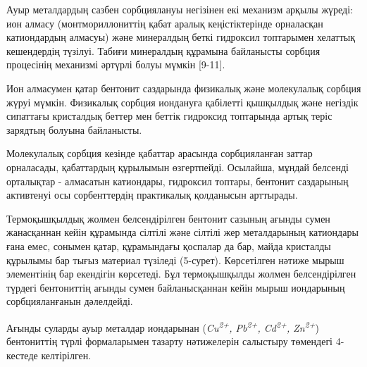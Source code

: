 \begin{multicols}{2}
Ауыр металдардың сазбен сорбциялануы негізінен екі механизм арқылы
жүреді: ион алмасу (монтмориллониттің қабат аралық кеңістіктерінде
орналасқан катиондардың алмасуы) және минералдың беткі гидроксил
топтарымен хелаттық кешендердің түзілуі. Табиғи минералдың құрамына
байланысты сорбция процесінің механизмі әртүрлі болуы мүмкін {[}9-11{]}.

Ион алмасумен қатар бентонит саздарында физикалық және молекулалық
сорбция жүруі мүмкін. Физикалық сорбция иондануға қабілетті қышқылдық
және негіздік сипаттағы кристалдық беттер мен беттік гидроксид
топтарында артық теріс зарядтың болуына байланысты.

Молекулалық сорбция кезінде қабаттар арасында сорбцияланған заттар
орналасады, қабаттардың құрылымын өзгертпейді. Осылайша, мұндай белсенді
орталықтар - алмасатын катиондары, гидроксил топтары, бентонит
саздарының активтенуі осы сорбенттердің практикалық қолданысын
арттырады.

Термоқышқылдық жолмен белсендірілген бентонит сазының ағынды сумен
жанасқаннан кейін құрамында сілтілі және сілтілі жер металдарының
катиондары ғана емес, сонымен қатар, құрамындағы қоспалар да бар, майда
кристалды құрылымы бар тығыз материал түзіледі (5-сурет). Көрсетілген
нәтиже мырыш элементінің бар екендігін көрсетеді. Бұл термоқышқылды
жолмен белсендірілген түрдегі бентониттің ағынды сумен байланысқаннан
кейін мырыш иондарының сорбцияланғанын дәлелдейді.

Ағынды суларды ауыр металдар иондарынан (\emph{Cu\textsuperscript{2+},
Pb\textsuperscript{2+}, Cd\textsuperscript{2+}, Zn\textsuperscript{2+}})
бентониттің түрлі формаларымен тазарту нәтижелерін салыстыру төмендегі
4-кестеде келтірілген.
\end{multicols}

